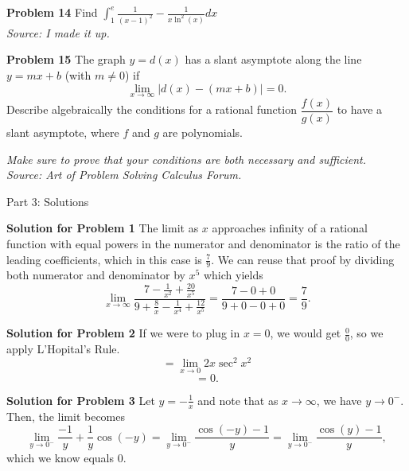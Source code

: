\documentclass{article}
\begin{document}
\vspace{1cm}

\textbf{Problem 14} Find $\displaystyle \int_{1}^{e} \frac {1} {\left( x - 1 \right)^{2}} - \frac {1} {x\ln^{2} \left( x \right)} dx$\\
\textit{Source: I made it up.}

\vspace{1cm}

\textbf{Problem 15} The graph $y = d(x)$ has a slant asymptote along the line $y = mx + b$ (with $m \not= 0$) if
$$
\displaystyle\lim_{x \rightarrow \infty} |d(x) - (mx+b)| = 0.
$$Describe algebraically the conditions for a rational function $\dfrac{f(x)}{g(x)}$ to have a slant asymptote, where $f$ and $g$ are polynomials.

\textit{Make sure to prove that your conditions are both necessary and sufficient.}\\
\textit{Source: Art of Problem Solving Calculus Forum.}



\newpage

\begin{comment}
	Indeterminate Limits Solutions
\end{comment}

\LARGE Part 3: Solutions

\vspace{2cm}

\large

\textbf{Solution for Problem 1} The limit as $x$ approaches infinity of a rational function with equal powers in the numerator and denominator is the ratio of the leading coefficients, which in this case is $\boxed{\frac{7}{9}}$. We can reuse that proof by dividing both numerator and denominator by $x^5$ which yields\\
$$ \lim_{x \rightarrow \infty} \frac{7 - \frac{1}{x^2} + \frac{20}{x^5}}{9+\frac{8}{x}-\frac{1}{x^4}+\frac{12}{x^5}} = \frac{7-0+0}{9+0-0+0} = \boxed{\frac{7}{9}}.$$

\vspace{1cm}



\textbf{Solution for Problem 2} If we were to plug in $x = 0$, we would get $\frac {0} {0}$, so we apply L'Hopital's Rule.
\[= \lim_{x \to 0} 2x\sec^{2}x^{2}\]
\[= \boxed{0}.\]

\vspace{1cm}



\textbf{Solution for Problem 3} Let $y = -\frac{1}{x}$ and note that as $x \rightarrow \infty$, we have $y \rightarrow 0^-$. Then, the limit becomes\\
\[\lim_{y \rightarrow 0^-} \frac{-1}{y} + \frac{1}{y}\cos(-y) = \lim_{y \rightarrow 0^-} \frac{\cos(-y) -1}{y} = \lim_{y \rightarrow 0^-} \frac{\cos(y) -1}{y},\]which we know equals $\boxed{0}.$
\end{document}
